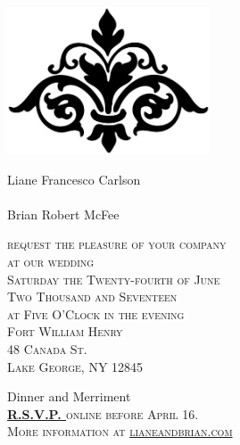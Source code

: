 \documentclass{letter}[12pt]
\newcommand*\initfamily{\usefont{U}{Typocaps}{xl}{n}}
\begin{document}
\begin{letter}{}
   \begin{center}
     \includegraphics[width=6cm]{flourish.eps}

     \vspace{5mm}

\normalfont\calligra
\Large
{\selectfont\Huge L}iane
{\selectfont\Huge F}rancesco
{\selectfont\Huge C}arlson\\
{\selectfont{and}}\\
{\selectfont\Huge B}rian
{\selectfont\Huge R}obert
{\selectfont\Huge M}cFee

     \vspace{5mm}

{\normalfont\scshape\normalsize
     request the pleasure of your company\\
     at our wedding\\
     Saturday the Twenty-fourth of June\\
     Two Thousand and Seventeen\\
     at Five O'Clock in the evening\\
     Fort William Henry\\
     48 Canada St.\\
     Lake George, NY 12845

     \vspace{2mm}
}
     {\selectfont Dinner and Merriment}\\
     \vspace{2mm}
     {\normalfont\scshape\normalsize \textbf{\href{http://lianeandbrian.com}{R.S.V.P. }}online before April 16.\\
     More information at \href{http://lianeandbrian.com/}{lianeandbrian.com}}

     \vspace{5mm}
    
   \end{center}

       \end{letter}
       
\end{document}
